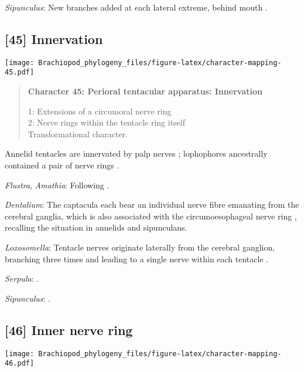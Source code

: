 \documentclass[openany]{book}
\theoremstyle{definition}
\theoremstyle{definition}
\theoremstyle{definition}
\theoremstyle{remark}
\begin{document}
\hypertarget{Sipunculus-coding-44}{}
\emph{Sipunculus}: New branches added at each lateral extreme, behind
mouth \citep{Adrianov2006}.

\subsection*{{[}45{]} Innervation}\label{innervation}

\texttt{[image: Brachiopod\_phylogeny\_files/figure-latex/character-mapping-45.pdf]}

\begin{quote}
\textbf{Character 45: Perioral tentacular apparatus: Innervation}

1: Extensions of a circumoral nerve ring\\
2: Nerve rings within the tentacle ring itself\\
Transformational character.
\end{quote}

Annelid tentacles are innervated by palp nerves \citep{Orrhage2005};
lophophores ancestrally contained a pair of nerve rings
\citep{Temereva2017Innervationof}.

\hypertarget{Amathia-coding-45}{}
\emph{Flustra}, \emph{Amathia}: Following
\citet{Temereva2017Innervationof}.

\hypertarget{Dentalium-coding-45}{}
\emph{Dentalium}: The captacula each bear an individual nerve fibre
emanating from the cerebral ganglia, which is also associated with the
circumoesophageal nerve ring \citep{SumnerRooney2015}, recalling the
situation in annelids and sipunculans.

\hypertarget{Loxosomella-coding-45}{}
\emph{Loxosomella}: Tentacle nerves originate laterally from the
cerebral ganglion, branching three times and leading to a single nerve
within each tentacle \citep{Fuchs2006}.

\hypertarget{Serpula-coding-45}{}
\emph{Serpula}: \citet{Orrhage2005}.

\hypertarget{Sipunculus-coding-45}{}
\emph{Sipunculus}: \citet{Rice1993}.

\subsection*{{[}46{]} Inner nerve ring}\label{inner-nerve-ring}

\texttt{[image: Brachiopod\_phylogeny\_files/figure-latex/character-mapping-46.pdf]}
\end{document}

